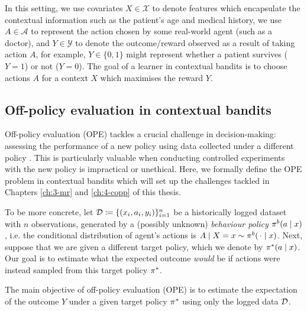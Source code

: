 In this setting, we use covariates $X \in \mathcal{X}$ to denote features which encapsulate the contextual information such as the patient's age and medical history, we use $A \in \mathcal{A}$ to represent the action chosen by some real-world agent (such as a doctor), and $Y \in \mathcal{Y}$ to denote the outcome/reward observed as a result of taking action $A$, for example, $Y \in \{0, 1\}$ might represent whether a patient survives ($Y=1$) or not ($Y=0$). The goal of a learner in contextual bandits is to choose actions $A$ for a context $X$ which maximises the reward $Y$. 

\subsection{Off-policy evaluation in contextual bandits}
Off-policy evaluation (OPE) tackles a crucial challenge in decision-making: assessing the performance of a new policy using data collected under a different policy \citep{swaminathan2015counterfactual, wang2017optimal, farajtabar2018more, su2019continuous, metelli2021subgaussian, liu2019triply, sugiyama2012machine, swaminathan2017off}. This is particularly valuable when conducting controlled experiments with the new policy is impractical or unethical. Here, we formally define the OPE problem in contextual bandits which will set up the challenges tackled in Chapters \ref{ch:3-mr} and \ref{ch:4-copp} of this thesis. 

To be more concrete, let $\mathcal{D}\coloneqq \{(x_i, a_i, y_i)\}_{i=1}^n$ be a historically logged dataset with $n$ observations, generated by a (possibly unknown) \emph{behaviour policy} $\pi^b(a\mid x)$, i.e. the conditional distribution of agent's actions is $A\mid X=x \sim \pi^b(\,\cdot\mid x)$.
Next, suppose that we are given a different target policy, which we denote by $\pi^*(a\mid x)$. Our goal is to estimate what the expected outcome \emph{would} be if actions were instead sampled from this target policy $\pi^*$.

\begin{importantresultwithtitle}[title=Off-policy evaluation (OPE)]\noindent
    The main objective of off-policy evaluation (OPE) is to estimate the expectation of the outcome $Y$ under a given target policy $\pi^*$ using only the logged data $\mathcal{D}$.
\end{importantresultwithtitle}

